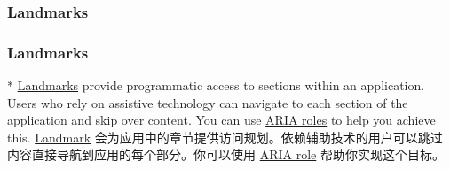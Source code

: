 \begin{paracol}{2}
\subsubsection{Landmarks}
\switchcolumn
\subsubsection{Landmarks}
\switchcolumn[0]*%
\href{https://developer.mozilla.org/en-US/docs/Web/Accessibility/ARIA/Roles/landmark_role}{Landmarks}
provide programmatic access to sections within an application. Users who
rely on assistive technology can navigate to each section of the
application and skip over content. You can use
\href{https://developer.mozilla.org/en-US/docs/Web/Accessibility/ARIA/Roles}{ARIA
roles} to help you achieve this.
\switchcolumn
\href{https://developer.mozilla.org/en-US/docs/Web/Accessibility/ARIA/Roles/landmark_role}{Landmark}
会为应用中的章节提供访问规划。依赖辅助技术的用户可以跳过内容直接导航到应用的每个部分。你可以使用
\href{https://developer.mozilla.org/en-US/docs/Web/Accessibility/ARIA/Roles}{ARIA
role} 帮助你实现这个目标。
\end{paracol}



\begin{paracol}{2} 

\end{paracol}


\begin{paracol}{2} 

\end{paracol}



\begin{paracol}{2} 

\end{paracol}



\begin{paracol}{2} 

\end{paracol}


\begin{paracol}{2} 

\end{paracol}



\begin{paracol}{2} 

\end{paracol}



